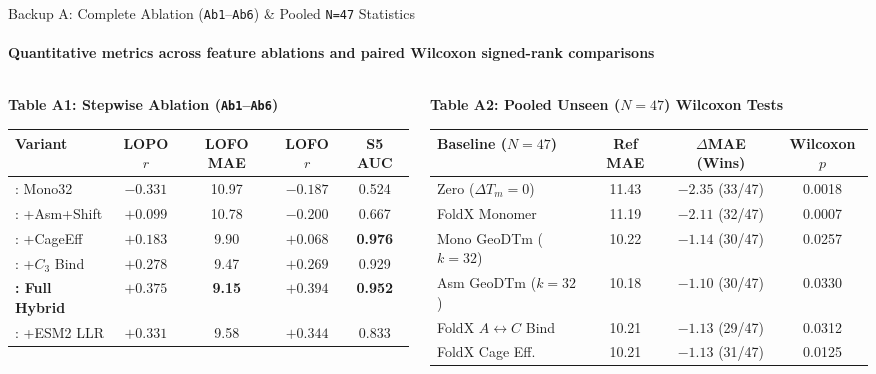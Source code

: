 \documentclass[aspectratio=169,10pt]{beamer}
\newcommand{\DTm}{\ensuremath{\Delta T_m}}
\newcommand{\code}[1]{\texttt{\detokenize{#1}}}
\begin{document}
\begin{frame}{Backup A: Complete Ablation (\texttt{Ab1}--\texttt{Ab6}) \& Pooled \texttt{N=47} Statistics}
  \framesubtitle{Quantitative metrics across feature ablations and paired Wilcoxon signed-rank comparisons}

  \begin{columns}[T,totalwidth=\textwidth]
    \begin{column}{0.49\textwidth}
      \textbf{\footnotesize Table A1: Stepwise Ablation (\texttt{Ab1}--\texttt{Ab6})}\\[3pt]
      \setlength{\tabcolsep}{3pt}
      \fontsize{7.1}{9.1}\selectfont
      \begin{tabular}{@{}lcccc@{}}
        \toprule
        \textbf{Variant} & \textbf{LOPO $r$} & \textbf{LOFO MAE} & \textbf{LOFO $r$} & \textbf{S5 AUC} \\
        \midrule
        \code{Ab1}: Mono32 & $-0.331$ & 10.97 & $-0.187$ & 0.524 \\
        \code{Ab2}: +Asm+Shift & $+0.099$ & 10.78 & $-0.200$ & 0.667 \\
        \code{Ab3}: +CageEff & $+0.183$ & 9.90 & $+0.068$ & \textbf{0.976} \\
        \code{Ab4}: +$C_3$ Bind & $+0.278$ & 9.47 & $+0.269$ & 0.929 \\
        \textbf{\code{Ab5}: Full Hybrid} & \textbf{$+0.375$} & \textbf{9.15} & \textbf{$+0.394$} & \textbf{0.952} \\
        \code{Ab6}: +ESM2 LLR & $+0.331$ & 9.58 & $+0.344$ & 0.833 \\
        \bottomrule
      \end{tabular}
    \end{column}

    \begin{column}{0.49\textwidth}
      \textbf{\footnotesize Table A2: Pooled Unseen ($N=47$) Wilcoxon Tests}\\[3pt]
      \setlength{\tabcolsep}{3pt}
      \fontsize{7.1}{9.1}\selectfont
      \begin{tabular}{@{}lccc@{}}
        \toprule
        \textbf{Baseline ($N=47$)} & \textbf{Ref MAE} & \textbf{$\Delta$MAE (Wins)} & \textbf{Wilcoxon $p$} \\
        \midrule
        Zero ($\DTm=0$) & 11.43 & $-2.35$ (33/47) & 0.0018 \\
        FoldX Monomer & 11.19 & $-2.11$ (32/47) & 0.0007 \\
        Mono GeoDTm ($k=32$) & 10.22 & $-1.14$ (30/47) & 0.0257 \\
        Asm GeoDTm ($k=32$) & 10.18 & $-1.10$ (30/47) & 0.0330 \\
        FoldX $A{\leftrightarrow}C$ Bind & 10.21 & $-1.13$ (29/47) & 0.0312 \\
        FoldX Cage Eff. & 10.21 & $-1.13$ (31/47) & 0.0125 \\
        \bottomrule
      \end{tabular}
    \end{column}
  \end{columns}


\end{frame}
\end{document}

